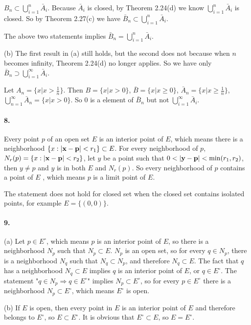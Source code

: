 \documentclass[a4paper]{article}
\begin{document}
$B_n\subset\bigcup_{i=1}^n\bar{A}_i$. Because $\bar{A}_i$ is closed, by Theorem 2.24(d) we know $\bigcup_{i=1}^n\bar{A}_i$ is closed. So by Theorem 2.27(c) we have $\bar{B}_n\subset\bigcup_{i=1}^n\bar{A}_i$.

The above two statements implies $\bar{B}_n=\bigcup_{i=1}^n\bar{A}_i$.
\medskip

(b) The first result in (a) still holds, but the second does not because when $n$ becomes infinity, Theorem 2.24(d) no longer applies. So we have only $\bar{B}_n\supset\bigcup_{i=1}^\infty\bar{A}_i$. 

Let $A_n=\{x|x>\frac{1}{n}\}$. Then $B=\{x|x>0\}$, $\bar{B}=\{x|x\geq0\}$, $\bar{A}_n=\{x|x\geq\frac{1}{n}\}$, $\bigcup_{n=1}^\infty\bar{A}_n=\{x|x>0\}$. So $0$ is a element of $\bar{B}_n$ but not $\bigcup_{i=1}^\infty\bar{A}_i$.

\paragraph{8.}
Every point $p$ of an open set $E$ is an interior point of $E$, which means there is a neighborhood $\{x:|\mathbf{x}-\mathbf{p}|<r_1\}\subset E$. For every neighborhood of $p$, $N_r(p)=\{x:|\mathbf{x}-\mathbf{p}|<r_2\}$, let $y$ be a point such that $0<|\V{y}-\V{p}|<\min(r_1,r_2)$, then $y\neq p$ and $y$ is in both $E$ and $N_r(p)$. So every neighborhood of $p$ contains a point of $E$ , which means $p$ is a limit point of $E$.

The statement does not hold for closed set when the closed set contains isolated points, for example $E=\{(0,0)\}$.

\paragraph{9.}
(a) Let $p\in E^\circ$, which means $p$ is an interior point of $E$, so there is a neighborhood $N_p$ such that $N_p\subset E$. $N_p$ is an open set, so for every $q\in N_p$, there is a neighborhood $N_q$ such that $N_q\subset N_p$, and therefore $N_q\subset E$. The fact that $q$ has a neighborhood $N_q\subset E$ implies $q$ is an interior point of $E$, or $q\in E^\circ$. The statement "$q\in N_p\Rightarrow q\in E^\circ$" implies $N_p\subset E^\circ$, so for every $p\in E^\circ$ there is a neighborhood $N_p\subset E^\circ$, which means $E^\circ$ is open.
\medskip

(b) If $E$ is open, then every point in $E$ is an interior point of $E$ and therefore belongs to $E^\circ$, so $E\subset E^\circ$. It is obvious that $E^\circ\subset E$, so $E=E^\circ$.
\end{document}
